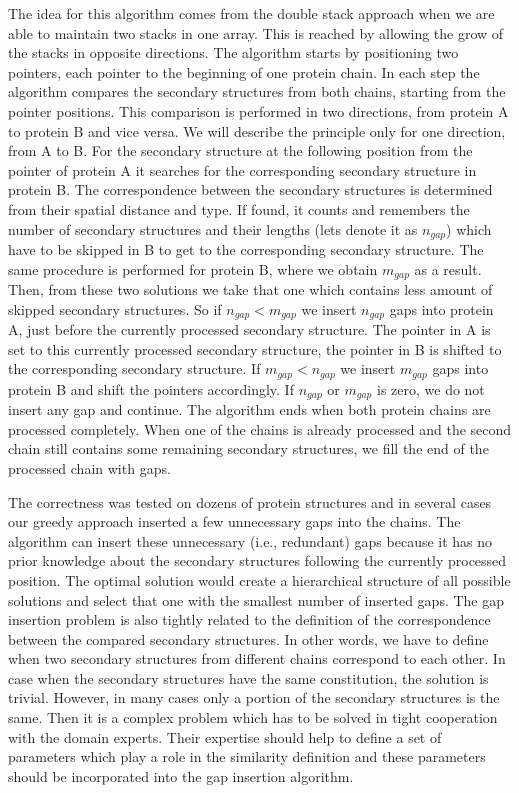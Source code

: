 \documentclass[twocolumn]{bmcart}%
\begin{document}
The idea for this algorithm comes from the double stack approach when we are able to maintain two stacks in one array.
This is reached by allowing the grow of the stacks in opposite directions.
The algorithm starts by positioning two pointers, each pointer to the beginning of one protein chain.
In each step the algorithm compares the secondary structures from both chains, starting from the pointer positions.
This comparison is performed in two directions, from protein A to protein B and vice versa.
We will describe the principle only for one direction, from A to B.
For the secondary structure at the following position from the pointer of protein A it searches for the corresponding secondary structure in protein B.
The correspondence between the secondary structures is determined from their spatial distance and type.
If found, it counts and remembers the number of secondary structures and their lengths (lets denote it as $n_{gap}$) which have to be skipped in B to get to the corresponding secondary structure.
The same procedure is performed for protein B, where we obtain $m_{gap}$ as a result.
Then, from these two solutions we take that one which contains less amount of skipped secondary structures.
So if $n_{gap} < m_{gap}$ we insert $n_{gap}$ gaps into protein A, just before the currently processed secondary structure.
The pointer in A is set to this currently processed secondary structure, the pointer in B is shifted to the corresponding secondary structure.
If $m_{gap} < n_{gap}$ we insert $m_{gap}$ gaps into protein B and shift the pointers accordingly.
If $n_{gap}$ or $m_{gap}$ is zero, we do not insert any gap and continue.
The algorithm ends when both protein chains are processed completely.
When one of the chains is already processed and the second chain still contains some remaining secondary structures, we fill the end of the processed chain with gaps.

The correctness was tested on dozens of protein structures and in several cases our greedy approach inserted a few unnecessary gaps into the chains.
The algorithm can insert these unnecessary (i.e., redundant) gaps because it has no prior knowledge about the secondary structures following the currently processed position.
The optimal solution would create a hierarchical structure of all possible solutions and select that one with the smallest number of inserted gaps.
The gap insertion problem is also tightly related to the definition of the correspondence between the compared secondary structures.
In other words, we have to define when two secondary structures from different chains correspond to each other.
In case when the secondary structures have the same constitution, the solution is trivial.
However, in many cases only a portion of the secondary structures is the same.
Then it is a complex problem which has to be solved in tight cooperation with the domain experts.
Their expertise should help to define a set of parameters which play a role in the similarity definition and these parameters should be incorporated into the gap insertion algorithm. 
\end{document}
